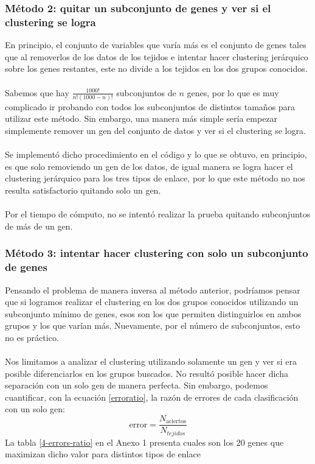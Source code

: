 \documentclass[11pt]{article}
\begin{document}
\subsubsection{Método 2: quitar un subconjunto de genes y ver si el clustering se logra}
En principio, el conjunto de variables que varía más es el conjunto de genes tales que al removerlos de los datos de los tejidos e intentar hacer clustering jerárquico sobre los genes restantes, este no divide a los tejidos en los dos grupos conocidos.
\\
\\Sabemos que hay $\frac{1000!}{n!(1000-n)!}$ subconjuntos de $n$ genes, por lo que es muy complicado ir probando con todos los subconjuntos de distintos tamaños para utilizar este método. Sin embargo, una manera más simple sería empezar simplemente remover un gen del conjunto de datos y ver si el clustering se logra.
\\
\\Se implementó dicho procedimiento en el código y lo que se obtuvo, en principio, es que solo removiendo un gen de los datos, de igual manera se logra hacer el clustering jerárquico para los tres tipos de enlace, por lo que este método no nos resulta satisfactorio quitando solo un gen.
\\
\\Por el tiempo de cómputo, no se intentó realizar la prueba quitando subconjuntos de más de un gen.
\subsubsection{Método 3: intentar hacer clustering con solo un subconjunto de genes}
Pensando el problema de manera inversa al método anterior, podríamos pensar que si logramos realizar el clustering en los dos grupos conocidos utilizando un subconjunto mínimo de genes, esos son los que permiten distinguirlos en ambos grupos y los que varían más. Nuevamente, por el número de subconjuntos, esto no es práctico.
\\
\\Nos limitamos a analizar el clustering utilizando solamente un gen y ver si era posible diferenciarlos en los grupos buscados. No resultó posible hacer dicha separación con un solo gen de manera perfecta. Sin embargo, podemos cuantificar, con la ecuación \ref{erroratio}, la razón de errores de cada clasificación con un solo gen:
\begin{equation}
    \label{erroratio}
    \text{error} = \frac{N_{\text{aciertos}}}{N_{tejidos}}
\end{equation}
La tabla \ref{4-errors-ratio} en el Anexo 1 presenta cuales son los 20 genes que maximizan dicho valor para distintos tipos de enlace
\end{document}
